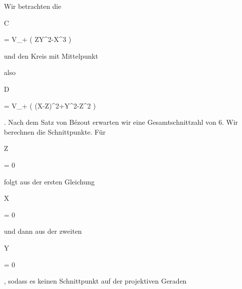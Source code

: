 {


Wir betrachten die


\mavergleichskette

{\vergleichskette

{C
}

{ = }{ V_+ \left(  ZY^2-X^3  \right)
}

{  }{
}

{    }{
}

{   }{
}

}
{}{}{}
und den Kreis mit Mittelpunkt

 also


\mavergleichskette

{\vergleichskette

{D
}

{ = }{ V_+ \left(  (X-Z)^2+Y^2-Z^2  \right)
}

{  }{
}

{    }{
}

{   }{
}

}
{}{}{.}
Nach
dem Satz von Bézout
erwarten wir eine Gesamtschnittzahl von $6$. Wir berechnen die Schnittpunkte. Für


\mavergleichskette

{\vergleichskette

{Z
}

{ = }{ 0
}

{  }{
}

{    }{
}

{   }{
}

}
{}{}{}
folgt aus der ersten Gleichung


\mavergleichskette

{\vergleichskette

{X
}

{ = }{ 0
}

{  }{
}

{    }{
}

{   }{
}

}
{}{}{}
und dann aus der zweiten


\mavergleichskette

{\vergleichskette

{Y
}

{ = }{ 0
}

{  }{
}

{    }{
}

{   }{
}

}
{}{}{,}
sodass es keinen Schnittpunkt auf der projektiven Geraden

}
